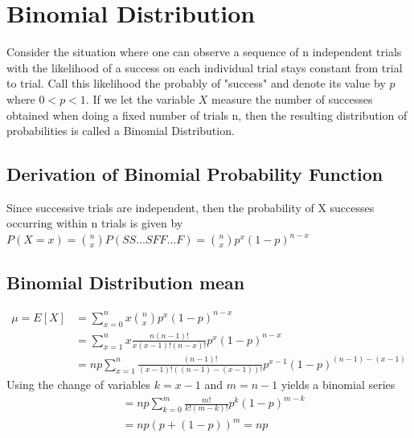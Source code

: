 \documentclass[10pt,]{book}
\theoremstyle{plain}
\theoremstyle{definition}
\theoremstyle{definition}
\numberwithin{equation}{section}
\newcommand{\lt}{ < }
\begin{document}
\section[Binomial Distribution]{Binomial Distribution}\label{BinomialDistribution}
Consider the situation where one can observe a sequence  of n
	independent trials with the likelihood of a 
	success on each individual trial stays constant from trial to trial.
	Call this likelihood the probably of "success" and 
	denote its value by 
	\(p\) where \( 0 \lt p \lt 1 \).  
	If we let the variable \(X\) measure the number of successes 
	obtained when doing a fixed number of trials n, then the resulting
	distribution of probabilities is called a Binomial Distribution.%
\typeout{************************************************}
\typeout{************************************************}
\subsection[Derivation of Binomial Probability Function]{Derivation of Binomial Probability Function}\label{subsection-11}
 Since successive trials are independent, then the probability of X successes occurring within n 
		trials is given by 
		\(P(X=x) = \binom{n}{x}P(SS...SFF...F) = \binom{n}{x}p^x(1-p)^{n-x}\)%
\typeout{************************************************}
\typeout{************************************************}
\subsection[Binomial Distribution mean]{Binomial Distribution mean}\label{subsection-12}
\begin{align*}
 \mu = E[X] & = \sum_{x=0}^{n} {x \binom{n}{x} p^x (1-p)^{n-x}}\\
 & = \sum_{x=1}^{n} {x \frac{n(n-1)!}{x(x-1)!(n-x)!} p^x (1-p)^{n-x}}\\
 & = np \sum_{x=1}^{n} {\frac{(n-1)!}{(x-1)!((n-1)-(x-1))!} p^{x-1} (1-p)^{(n-1)-(x-1)}}
\end{align*}Using the change of variables \(k=x-1\) and \(m = n-1\) yields a binomial series%
\begin{align*}
 & = np \sum_{k=0}^{m} {\frac{m!}{k!(m-k)!} p^k (1-p)^{m-k}}\\
 & = np (p + (1-p))^m = np
\end{align*}\typeout{************************************************}
\typeout{************************************************}
\end{document}

